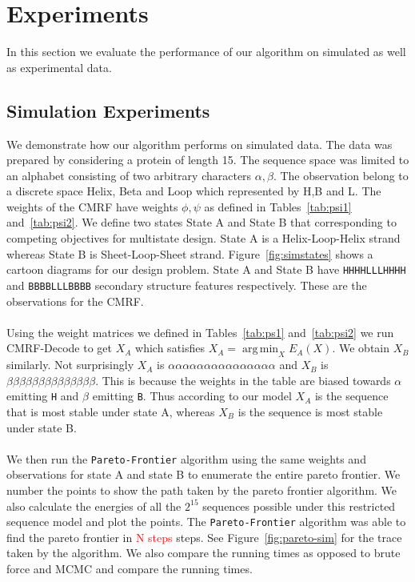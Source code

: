 \documentclass{article}
\DeclareMathOperator*{\argmin}{arg\,min}
\begin{document}
\section{Experiments}
In this section we evaluate the performance of our algorithm on simulated as well as experimental data. 

\subsection{Simulation Experiments}
We demonstrate how our algorithm performs on simulated data. The data was prepared by considering a protein of length 15. The sequence space was limited to an alphabet consisting of two arbitrary characters $\alpha,\beta$. The observation belong to a discrete space Helix, Beta and Loop which represented by H,B and L. The weights of the CMRF have weights $\phi,\psi$ as defined in Tables~\ref{tab:psi1} and~\ref{tab:psi2}. We define two states State A and State B that corresponding to competing objectives for multistate design. State A is a Helix-Loop-Helix strand whereas State B is Sheet-Loop-Sheet strand. Figure~\ref{fig:simstates} shows a cartoon diagrams for our design problem. State A and State B have \texttt{HHHHLLLHHHH} and \texttt{BBBBLLLBBBB} secondary structure features respectively. These are the observations for the CMRF.
\\
\\
Using the weight matrices we defined in Tables~\ref{tab:ps1} and~\ref{tab:psi2} we run CMRF-Decode to get $X_A$ which satisfies $X_A = \argmin_X E_A(X)$. We obtain $X_B$ similarly. Not surprisingly $X_A$ is $\alpha\alpha\alpha\alpha\alpha\alpha\alpha\alpha\alpha\alpha\alpha\alpha\alpha\alpha\alpha$ 
and $X_B$ is $\beta\beta\beta\beta\beta\beta\beta\beta\beta\beta\beta\beta\beta\beta$. This is because the weights in the table are biased towards $\alpha$ emitting \texttt{H} and $\beta$ emitting \texttt{B}. Thus according to our model $X_A$ is the sequence that is most stable under state A, whereas $X_B$ is the sequence is most stable under state B.
\\
\\
We then run the \texttt{Pareto-Frontier} algorithm using the same weights and observations for state A and state B to enumerate the entire pareto frontier. We number the points to show the path taken by the pareto frontier algorithm. We also calculate the energies of all the $2^15$ sequences possible under this restricted sequence model and plot the points. The \texttt{Pareto-Frontier} algorithm was able to find the pareto frontier in \textcolor{red}{N steps} steps. See Figure~\ref{fig:pareto-sim} for the trace taken by the algorithm.  We also compare the running times as opposed to brute force and MCMC and compare the running times. 
\end{document}
